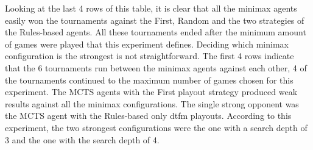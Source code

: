 Looking at the last 4 rows of this table, it is clear that all the minimax agents easily won the tournaments against the First, Random
and the two strategies of the Rules-based agents. All these tournaments ended after the minimum amount of games were played that this experiment defines.
Deciding which minimax configuration is the strongest is not straightforward. The first 4 rows indicate that the 6 tournaments run between
the minimax agents against each other, 4 of the tournaments continued to the maximum number of games chosen for this experiment. The MCTS agents
with the First playout strategy produced weak results against all the minimax configurations. The single strong opponent was the MCTS agent
with the Rules-based only dtfm playouts. According to this experiment, the two strongest configurations were the one with a search depth of 3
and the one with the search depth of 4.

